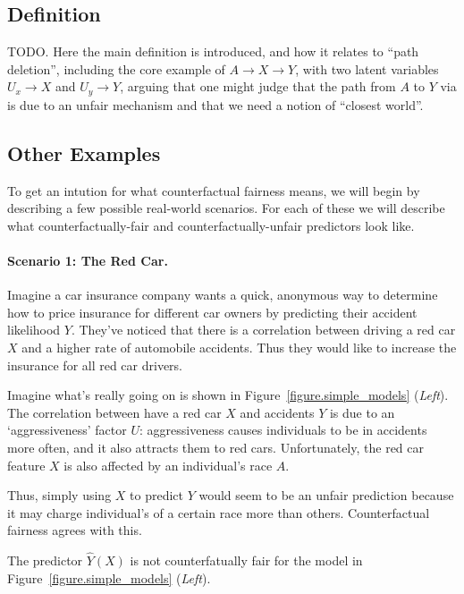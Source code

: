 \subsection{Definition}

TODO. Here the main definition is introduced, and how it relates to ``path deletion'',
including the core example of $A \rightarrow X \rightarrow Y$, with two latent
variables $U_x \rightarrow X$ and $U_y \rightarrow Y$, arguing that one might judge
that the path from $A$ to $Y$ via is due to an unfair mechanism and that we need a
notion of ``closest world''.

\subsection{Other Examples}
To get an intution for what counterfactual fairness means, we will begin by describing a few possible real-world scenarios. For each of these we will describe what counterfactually-fair and counterfactually-unfair predictors look like.

\paragraph{Scenario 1: The Red Car.}
Imagine a car insurance company wants a quick, anonymous way to determine how to price insurance for different car owners by predicting their accident likelihood $Y$. They've noticed that there is a correlation between driving a red car $X$ and a higher rate of automobile accidents. Thus they would like to increase the insurance for all red car drivers. 

Imagine what's really going on is shown in Figure~\ref{figure.simple_models} (\emph{Left}). The correlation between have a red car $X$ and accidents $Y$ is due to an `aggressiveness' factor $U$: aggressiveness causes individuals to be in accidents more often, and it also attracts them to red cars. Unfortunately, the red car feature $X$ is also affected by an individual's race $A$. 

Thus, simply using $X$ to predict $Y$ would seem to be an unfair prediction because it may charge individual's of a certain race more than others. Counterfactual fairness agrees with this. 

\begin{lem}
The predictor $\hat{Y}(X)$ is not counterfatually fair for the model in Figure~\ref{figure.simple_models} (\emph{Left}).
\end{lem}

